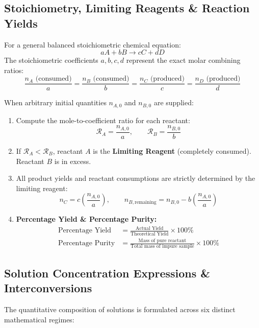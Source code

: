 \documentclass[10pt,a4paper]{article}
\begin{document}
\subsection{Stoichiometry, Limiting Reagents \& Reaction Yields}
For a general balanced stoichiometric chemical equation:
\begin{equation}
  aA + bB \longrightarrow cC + dD
\end{equation}
The stoichiometric coefficients $a, b, c, d$ represent the exact molar combining ratios:
\begin{equation}
  \frac{n_A\text{ (consumed)}}{a} = \frac{n_B\text{ (consumed)}}{b} = \frac{n_C\text{ (produced)}}{c} = \frac{n_D\text{ (produced)}}{d}
\end{equation}

\begin{usecasebox}
When arbitrary initial quantities $n_{A,0}$ and $n_{B,0}$ are supplied:
\begin{enumerate}
  \item Compute the mole-to-coefficient ratio for each reactant:
  \begin{equation}
    \mathcal{R}_A = \frac{n_{A,0}}{a}, \qquad \mathcal{R}_B = \frac{n_{B,0}}{b}
  \end{equation}
  \item If $\mathcal{R}_A < \mathcal{R}_B$, reactant $A$ is the \textbf{Limiting Reagent} (completely consumed). Reactant $B$ is in excess.
  \item All product yields and reactant consumptions are strictly determined by the limiting reagent:
  \begin{equation}
    n_C = c \left(\frac{n_{A,0}}{a}\right), \qquad n_{B,\text{remaining}} = n_{B,0} - b \left(\frac{n_{A,0}}{a}\right)
  \end{equation}
  \item \textbf{Percentage Yield \& Percentage Purity:}
  \begin{align}
    \text{Percentage Yield} &= \frac{\text{Actual Yield}}{\text{Theoretical Yield}} \times 100\% \\
    \text{Percentage Purity} &= \frac{\text{Mass of pure reactant}}{\text{Total mass of impure sample}} \times 100\%
  \end{align}
\end{enumerate}
\end{usecasebox}

\subsection{Solution Concentration Expressions \& Interconversions}
The quantitative composition of solutions is formulated across six distinct mathematical regimes:
\end{document}
